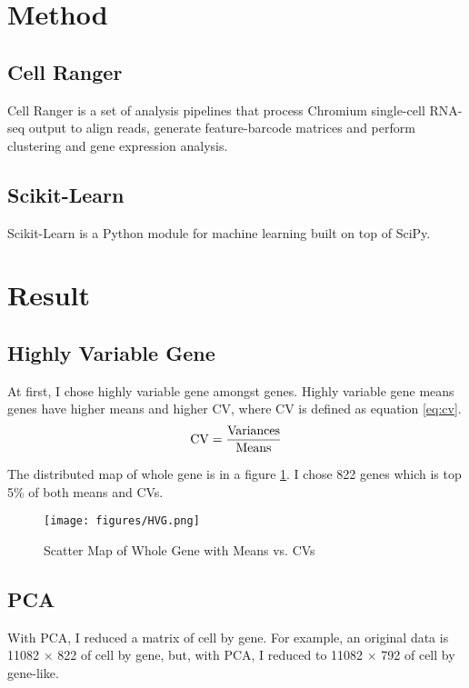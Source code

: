 \documentclass[aps, 10pt, a4paper]{article}
\begin{document}
    \section{Method}
        \subsection{Cell Ranger}
            Cell Ranger is a set of analysis pipelines that process Chromium single-cell RNA-seq output to align reads, generate feature-barcode matrices and perform clustering and gene expression analysis. \cite{ref:cellranger}
        
        \subsection{Scikit-Learn}
            Scikit-Learn is a Python module for machine learning built on top of SciPy. \cite{ref:scikit}
    
    \section{Result}
        \subsection{Highly Variable Gene}
            At first, I chose highly variable gene amongst genes. Highly variable gene means genes have higher means and higher CV, where CV is defined as equation \ref{eq:cv}.
            \begin{equation}
                \rm{CV} = \frac{\rm{Variances}}{\rm{Means}}
                \label{eq:cv}
            \end{equation}
            
            The distributed map of whole gene is in a figure \ref{fig:hvg}. I chose 822 genes which is top 5\% of both means and CVs. 
            \begin{figure}[tbph]
                \centering
                \texttt{[image: figures/HVG.png]}
                \caption{Scatter Map of Whole Gene with Means vs. CVs}
                \label{fig:hvg}
            \end{figure}
        
        \subsection{PCA}
            With PCA, I reduced a matrix of cell by gene. For example, an original data is 11082 $\times$ 822 of cell by gene, but, with PCA, I reduced to 11082 $\times$ 792 of cell by gene-like. 
    
\end{document}
